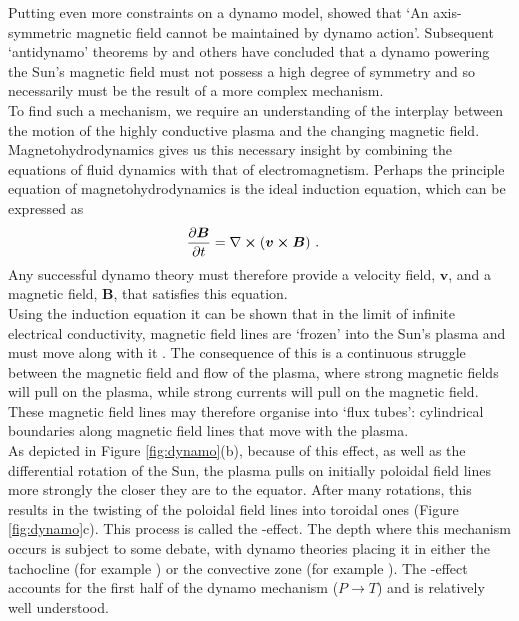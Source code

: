\documentclass[11pt,a4paper,onecolumn]{report}
\begin{document}
Putting even more constraints on a dynamo model, \citet{cowling1933} showed that
`An axis-symmetric magnetic field cannot be maintained by dynamo action'.
Subsequent `antidynamo' theorems by \citet{backus1956} and others have
concluded that a dynamo powering the Sun's magnetic field must not possess a
high degree of symmetry and so necessarily must be the result of a more complex
mechanism.\\


To find such a mechanism, we require an understanding of the interplay between the
motion of the highly conductive plasma and the changing magnetic field.
Magnetohydrodynamics gives us this necessary insight by combining the
equations of fluid dynamics with that of electromagnetism. Perhaps the principle
equation of magnetohydrodynamics is the ideal induction equation, which can be expressed as
\begin{align}
  \partialderivative{\bm{B}}{t} &=
  \nabla \crossproduct \left(\bm{v}\crossproduct \bm{B}\right)\,.
  \label{eqn:ideal_induction}
\end{align}
Any successful dynamo theory must therefore provide a
velocity field, \(\bm{v}\), and a magnetic field, \(\bm{B}\), that satisfies
this equation. \\

Using the induction equation it can be shown that in the limit of infinite
electrical conductivity, magnetic field lines are `frozen' into the Sun's plasma
and must move along with it \citep{Alfven1943}. The consequence of this is a
continuous struggle between the magnetic field and flow of the plasma, where
strong magnetic fields will pull on the plasma, while strong currents will pull
on the magnetic field. These magnetic field lines may therefore organise into
`flux tubes': cylindrical boundaries along magnetic field lines that move with
the plasma. \\

As depicted in Figure \ref{fig:dynamo}(b), because of this effect, as well as
the differential rotation of the Sun, the plasma pulls on initially poloidal
field lines more strongly the closer they are to the equator. After many
rotations, this results in the twisting of the poloidal field lines into
toroidal ones (Figure \ref{fig:dynamo}c). This process is called the
\textomega-effect. The depth where this mechanism occurs is subject to some
debate, with dynamo theories placing it in either the tachocline (for example
\citealt{deluca_dynamo_1988}) or the convective zone (for example
\citealp{chen_emergence_2017}). The \textomega-effect accounts for the first
half of the dynamo mechanism (\(P \rightarrow T\)) and is relatively well
understood.\\
\end{document}
